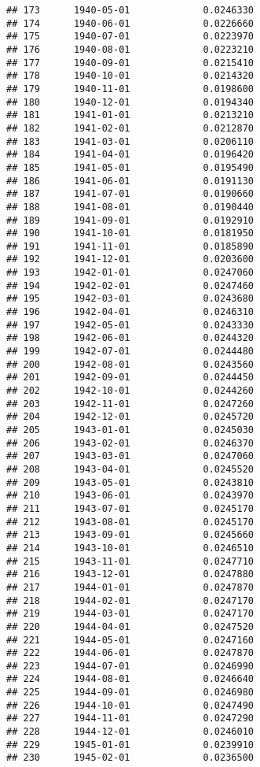 \documentclass[
]{article}
\begin{document}
\begin{verbatim}
## 173      1940-05-01             0.0246330
## 174      1940-06-01             0.0226660
## 175      1940-07-01             0.0223970
## 176      1940-08-01             0.0223210
## 177      1940-09-01             0.0215410
## 178      1940-10-01             0.0214320
## 179      1940-11-01             0.0198600
## 180      1940-12-01             0.0194340
## 181      1941-01-01             0.0213210
## 182      1941-02-01             0.0212870
## 183      1941-03-01             0.0206110
## 184      1941-04-01             0.0196420
## 185      1941-05-01             0.0195490
## 186      1941-06-01             0.0191130
## 187      1941-07-01             0.0190660
## 188      1941-08-01             0.0190440
## 189      1941-09-01             0.0192910
## 190      1941-10-01             0.0181950
## 191      1941-11-01             0.0185890
## 192      1941-12-01             0.0203600
## 193      1942-01-01             0.0247060
## 194      1942-02-01             0.0247460
## 195      1942-03-01             0.0243680
## 196      1942-04-01             0.0246310
## 197      1942-05-01             0.0243330
## 198      1942-06-01             0.0244320
## 199      1942-07-01             0.0244480
## 200      1942-08-01             0.0243560
## 201      1942-09-01             0.0244450
## 202      1942-10-01             0.0244260
## 203      1942-11-01             0.0247260
## 204      1942-12-01             0.0245720
## 205      1943-01-01             0.0245030
## 206      1943-02-01             0.0246370
## 207      1943-03-01             0.0247060
## 208      1943-04-01             0.0245520
## 209      1943-05-01             0.0243810
## 210      1943-06-01             0.0243970
## 211      1943-07-01             0.0245170
## 212      1943-08-01             0.0245170
## 213      1943-09-01             0.0245660
## 214      1943-10-01             0.0246510
## 215      1943-11-01             0.0247710
## 216      1943-12-01             0.0247880
## 217      1944-01-01             0.0247870
## 218      1944-02-01             0.0247170
## 219      1944-03-01             0.0247170
## 220      1944-04-01             0.0247520
## 221      1944-05-01             0.0247160
## 222      1944-06-01             0.0247870
## 223      1944-07-01             0.0246990
## 224      1944-08-01             0.0246640
## 225      1944-09-01             0.0246980
## 226      1944-10-01             0.0247490
## 227      1944-11-01             0.0247290
## 228      1944-12-01             0.0246010
## 229      1945-01-01             0.0239910
## 230      1945-02-01             0.0236500

\end{verbatim}
\end{document}
